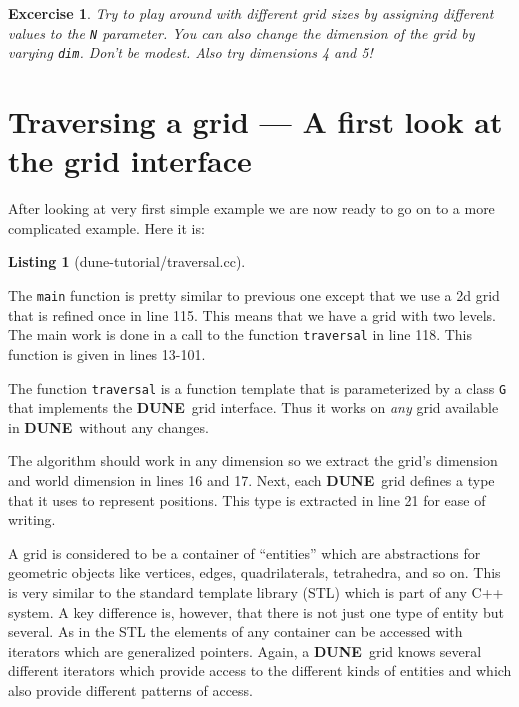 \documentclass[11pt,a4paper,headinclude,footinclude,DIV14,BCOR8.25mm,titlepage,twoside,openright,normalheadings]{scrreprt}
\newcommand{\Dune}{{\sf\bfseries DUNE}}
\newtheorem{exc}{Excercise}[chapter]
\newtheorem{lst}{Listing}
\begin{document}
\begin{exc} Try to play around with different grid sizes by assigning
  different values to the \lstinline!N! parameter. You can also change
  the dimension of the grid by varying \lstinline!dim!. Don't be
  modest. Also try dimensions 4 and 5!
\end{exc}

\section{Traversing a grid --- A first look at the grid interface}

After looking at very first simple example we are now ready to go on
to a more complicated example. Here it is:

\begin{lst}[dune-tutorial/traversal.cc] \mbox{}


\end{lst}

The \lstinline!main! function is pretty similar to previous one except
that we use a 2d grid that is refined once in line 115. This means
that we have a grid with two levels. The main work is done in a
call to the function \lstinline!traversal! in line 118. This function
is given in lines 13-101.

The function \lstinline!traversal! is a function template that is
parameterized by a class \lstinline!G! that implements the \Dune\ grid
interface. Thus it works on \textit{any} grid available in \Dune\
without any changes. 

The algorithm should work in any dimension so we extract the grid's
dimension and world dimension in lines 16 and 17. Next, each \Dune\
grid defines a type that it uses to represent positions. This type is
extracted in line 21 for ease of writing. 

A grid is considered to be a container of ``entities'' which are
abstractions for geometric objects like vertices, edges,
quadrilaterals, tetrahedra, and so on. This is very similar to the
standard template library (STL) which is part of any C++ system. A key
difference is, however, that there is not just one type of entity but
several. As in the STL the elements of any container can be accessed
with iterators which are generalized pointers. Again, a \Dune\ grid
knows several different iterators which provide access to the
different kinds of entities and which also provide different patterns
of access. 
\end{document}
